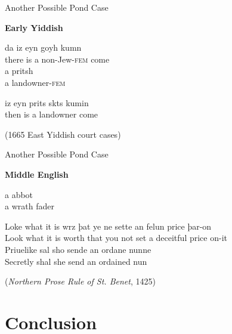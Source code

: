 \documentclass[hyperref={pdfpagelabels=false}]{beamer}
\begin{document}
\begin{frame}{Another Possible Pond Case}
 
 \begin{exe}

 	\ex \textbf{Early Yiddish}
 	\begin{xlist} 
 		\ex \gll da iz eyn goyh kumn\\
 		there is a non-Jew-\textsc{fem} come\\
 		\ex  \gll a pritsh\\
 		a landowner-\textsc{fem}\\
 	\end{xlist}
 	\ex \begin{xlist}
 		 \ex {} iz eyn {prits skts} kumin\\
 		 then is a landowner come\\
 		\end{xlist}
 	(1665 East Yiddish court cases)
 \end{exe}  

   
  
  
\end{frame}

\begin{frame}{Another Possible Pond Case}

\begin{exe}
	\ex \textbf{Middle English}
	\begin{xlist} 
		\ex  a abbot\\
		\ex  a wrath fader\\
	\end{xlist}
	\ex \begin{xlist} 
		\ex \gll Loke what it is wrz þat ye ne sette an felun price þar-on\\
		Look what it is worth that you not set a deceitful price on-it\\
		\ex \gll Priuelike sal sho sende an ordane nunne\\
		Secretly shal she send an ordained nun\\
	\end{xlist}
	(\textsl{Northern Prose Rule of St. Benet}, 1425)
\end{exe}  




\end{frame}




\section{Conclusion}
\end{document}
